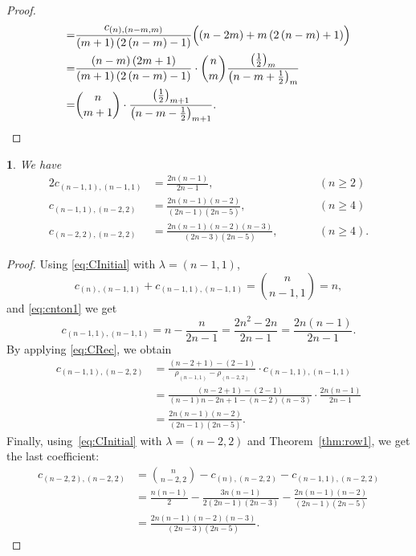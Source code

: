 \documentclass[10pt,oneside,american]{amsart}
\numberwithin{equation}{section}
\numberwithin{figure}{section}
\theoremstyle{plain}
\newtheorem{thm}{\protect\theoremname}[section]
\theoremstyle{definition}
\theoremstyle{remark}
\theoremstyle{plain}
\theoremstyle{definition}
\theoremstyle{plain}
\theoremstyle{plain}
\providecommand{\theoremname}{Theorem}
\begin{document}
\begin{proof}
\begin{align*}
 =& \frac{c_{\left(n\right),\left(n-m,m\right)}}{\left(m+1\right)\left(2\left(n-m\right)-1\right)}\Bigl(\left(n-2m\right)+m\left(2\left(n-m\right)+1\right)\Bigr) \\
 =& \frac{\left(n-m\right)\left(2m+1\right)}{\left(m+1\right)\left(2\left(n-m\right)-1\right)}\cdot\binom{n}{m}\frac{\bigl(\frac12\bigr)_m}{\bigl(n-m+\frac12\bigr)_m}\\
 =& \binom{n}{m+1}\cdot\frac{\bigl(\frac12\bigr)_{m+1}}{\bigl(n-m-\frac12\bigr)_{m+1}}.
\end{align*}
\end{proof}

\begin{thm}
\label{thm:fam1}
We have
\begin{alignat*}{2}
  c_{(n-1,1),(n-1,1)} &= \frac{2n(n-1)}{2n-1}, &\qquad& (n\geq2) \\
  c_{(n-1,1),(n-2,2)} &= \frac{2n(n-1)(n-2)}{(2n-1)(2n-5)}, && (n\geq4) \\
  c_{(n-2,2),(n-2,2)} &= \frac{2n(n-1)(n-2)(n-3)}{(2n-3)(2n-5)}, &&(n\geq4).
\end{alignat*}
\end{thm}
\begin{proof}
Using \eqref{eq:CInitial} with $\lambda=(n-1,1)$,
\[
  c_{\left(n\right),\left(n-1,1\right)}+c_{\left(n-1,1\right),\left(n-1,1\right)}=\binom{n}{n-1,1}=n,
\]
and \eqref{eq:cnton1} we get
\[
  c_{\left(n-1,1\right),\left(n-1,1\right)}=n-\frac{n}{2n-1}=\frac{2n^{2}-2n}{2n-1}=\frac{2n\left(n-1\right)}{2n-1}.
\]
By applying \eqref{eq:CRec}, we obtain
\begin{align*}
  c_{\left(n-1,1\right),\left(n-2,2\right)}
  &= \frac{\left(n-2+1\right)-\left(2-1\right)}{\rho_{\left(n-1,1\right)}-\rho_{\left(n-2,2\right)}}\cdot c_{(n-1,1),(n-1,1)}\\
  &= \frac{\left(n-2+1\right)-\left(2-1\right)}{\left(n-1\right)n-2n+1-\left(n-2\right)\left(n-3\right)}\cdot\frac{2n\left(n-1\right)}{2n-1}\\
  &= \frac{2n\left(n-1\right)\left(n-2\right)}{\left(2n-1\right)\left(2n-5\right)}.
\end{align*}
Finally, using~\eqref{eq:CInitial} with $\lambda=(n-2,2)$ and
Theorem~\ref{thm:row1}, we get the last coefficient:
\begin{align*}
  c_{\left(n-2,2\right),\left(n-2,2\right)}
  &= \binom{n}{n-2,2}-c_{\left(n\right),\left(n-2,2\right)}-c_{\left(n-1,1\right),\left(n-2,2\right)}\\
  &= \frac{n\left(n-1\right)}{2}-\frac{3n\left(n-1\right)}{2\left(2n-1\right)\left(2n-3\right)}-\frac{2n\left(n-1\right)\left(n-2\right)}{\left(2n-1\right)\left(2n-5\right)}\\
  &= \frac{2n\left(n-1\right)\left(n-2\right)\left(n-3\right)}{\left(2n-3\right)\left(2n-5\right)}.
\end{align*}
\end{proof}
\end{document}
